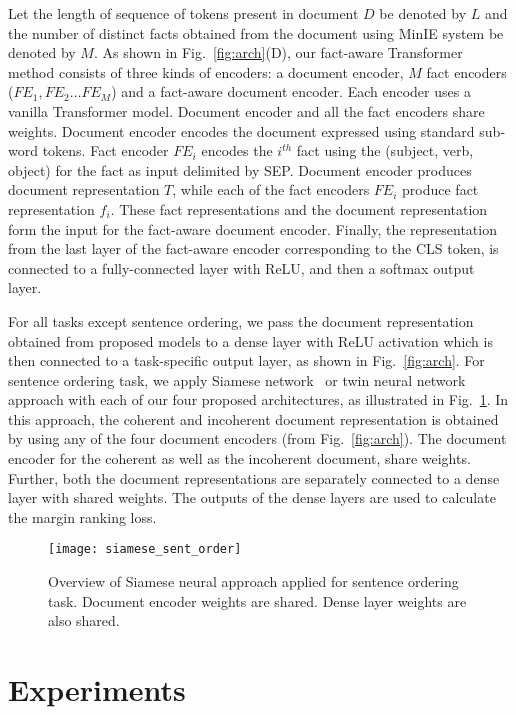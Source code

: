 \documentclass[11pt]{article}
\begin{document}
Let the length of sequence of tokens present in document $D$ be denoted by $L$ and the number of distinct facts obtained from the document using MinIE system be denoted by $M$. As shown in Fig.~\ref{fig:arch}(D), our fact-aware Transformer method consists of three kinds of encoders: a document encoder, $M$ fact encoders ($FE_1, FE_2\ldots FE_M$) and a fact-aware document encoder. Each encoder uses a vanilla Transformer model. Document encoder and all the fact encoders share weights. Document encoder encodes the document expressed using standard sub-word tokens. Fact encoder $FE_i$ encodes the $i^{th}$ fact using the (subject, verb, object) for the fact as input delimited by SEP. Document encoder produces document representation $T$, while each of the fact encoders $FE_i$ produce fact representation $f_i$. These fact representations and the document representation form the input for the fact-aware document encoder. Finally, the representation from the last layer of the fact-aware encoder corresponding to the CLS token, is connected to a fully-connected layer with ReLU, and then a softmax output layer. 

For all tasks except sentence ordering, we pass the document representation obtained from proposed models to a dense layer with ReLU activation which is then connected to a task-specific output layer, as shown in Fig.~\ref{fig:arch}. For sentence ordering task, we apply Siamese network~\cite{bromley1993signature} or twin neural network approach with each of our four proposed architectures, as illustrated in Fig.~\ref{fig:siamese_sent_order}. In this approach, the coherent and incoherent document representation is obtained by using any of the four document encoders (from Fig.~\ref{fig:arch}). The document encoder for the coherent as well as the incoherent document, share weights. Further, both the document representations are separately connected to a dense layer with shared weights. The outputs of the dense layers are used to calculate the margin ranking loss.

\begin{figure}
    \centering
    \texttt{[image: siamese\_sent\_order]}
    \caption{Overview of Siamese neural approach applied for sentence ordering task. Document encoder weights are shared. Dense layer weights are also shared.}
    \label{fig:siamese_sent_order}
\end{figure}

\section{Experiments}
\label{sec:experiments}
\end{document}
